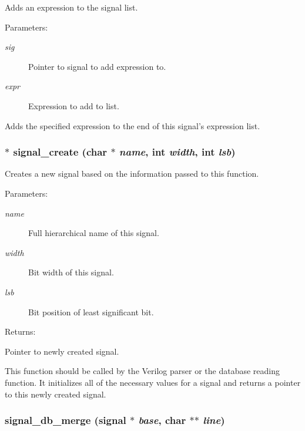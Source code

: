 Adds an expression to the signal list.

\begin{Desc}
\item[Parameters: ]\par
\begin{description}
\item[{\em 
sig}]Pointer to signal to add expression to. \item[{\em 
expr}]Expression to add to list.\end{description}
\end{Desc}
Adds the specified expression to the end of this signal's expression list. 
\subsubsection{$\ast$ signal\_\-create (char $\ast$ {\em name}, int {\em width}, int {\em lsb})}\label{signal_8c_a3}


Creates a new signal based on the information passed to this function.

\begin{Desc}
\item[Parameters: ]\par
\begin{description}
\item[{\em 
name}]Full hierarchical name of this signal. \item[{\em 
width}]Bit width of this signal. \item[{\em 
lsb}]Bit position of least significant bit.\end{description}
\end{Desc}
\begin{Desc}
\item[Returns: ]\par
Pointer to newly created signal.\end{Desc}
This function should be called by the Verilog parser or the database reading function. It initializes all of the necessary values for a signal and returns a pointer to this newly created signal. 
\subsubsection{ signal\_\-db\_\-merge ({\bf signal} $\ast$ {\em base}, char $\ast$$\ast$ {\em line})}\label{signal_8c_a6}


